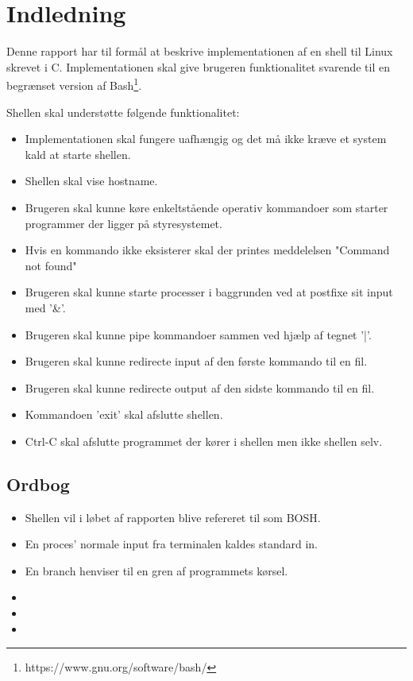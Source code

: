 \section{Indledning}
Denne rapport har til formål at beskrive implementationen af en shell til Linux skrevet i C. Implementationen skal give brugeren funktionalitet svarende til en begrænset version af Bash\footnote{https://www.gnu.org/software/bash/}. 

Shellen skal understøtte følgende funktionalitet:
\begin{itemize}
	\item Implementationen skal fungere uafhængig og det må ikke kræve et system kald at starte shellen.
	\item Shellen skal vise hostname.
	\item Brugeren skal kunne køre enkeltstående operativ kommandoer som starter programmer der ligger på styresystemet.
	\item Hvis en kommando ikke eksisterer skal der printes meddelelsen "Command not found"
	\item Brugeren skal kunne starte processer i baggrunden ved at postfixe sit input med '\&'.
	\item Brugeren skal kunne pipe kommandoer sammen ved hjælp af tegnet '|'.
	\item Brugeren skal kunne redirecte input af den første kommando til en fil.
	\item Brugeren skal kunne redirecte output af den sidste kommando til en fil.
	\item Kommandoen 'exit' skal afslutte shellen.
	\item Ctrl-C skal afslutte programmet der kører i shellen men ikke shellen selv.
\end{itemize}

\subsection{Ordbog}
\begin{itemize}
	\item Shellen vil i løbet af rapporten blive refereret til som BOSH.
	\item En proces' normale input fra terminalen kaldes standard in.
	\item En branch henviser til en gren af programmets kørsel.
	\item {}
	\item {}
	\item {}
\end{itemize}


